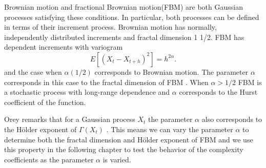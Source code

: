 Brownian motion and fractional Brownian motion(FBM)
are both Gaussian processes satisfying these conditions. In particular, both processes can be defined in terms of their increment process. 
Brownian motion has normally, independently 
distributed increments and fractal dimension 
1 1/2. FBM has dependent increments with
variogram 
\[
  E[(X_{t} - X_{t +h} )^2] = h^{2\alpha}.
\]
and the case when $\alpha (1/2)$ corresponds to 
Brownian motion. The parameter $\alpha$ 
corresponds in this case to the fractal dimension of 
FBM \cite{falconer2003}. When $\alpha > 1/2$ FBM is a stochastic process with long-range dependence and $\alpha$ corresponds
to the Hurst coefficient of the function.

Orey remarks that for a Gaussian process $X_t$ the 
parameter $\alpha$ also corresponds to the H\"older
exponent of $\Gamma(X_t)$ \cite{orey1970}. This means 
we can vary the parameter $\alpha$ to determine both 
the fractal dimension and H\"older exponent of 
FBM and we use this property in the following chapter 
to test the behavior of the complexity coefficients 
as the parameter $\alpha$ is varied.







